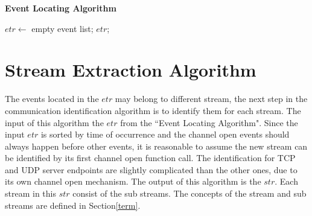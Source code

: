 \begin{algorithm}[H]
\DontPrintSemicolon
\caption{{\bf Event Locating Algorithm} \label{eventLocAlg}}
$etr \leftarrow $ empty event list;\; 
\KwRet $etr$;\;
\end{algorithm} 


\section{Stream Extraction Algorithm}
The events located in the $etr$ may belong to different stream, the next step in the communication identification algorithm is to identify them for each stream. The input of this algorithm the $etr$ from the ``Event Locating Algorithm". Since the input  $etr$ is sorted by time of occurrence and the channel open events should always happen before other events, it is reasonable to assume the new stream can be identified by its first channel open function call. The identification for TCP and UDP server endpoints are slightly complicated than the other ones, due to its own channel open mechanism. The output of this algorithm is the $str$. Each stream in this $str$ consist of the sub streams. The concepts of the stream and sub streams are defined in Section\ref{term}. 

